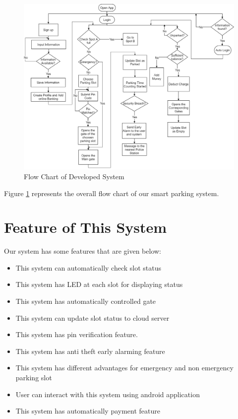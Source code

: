 \begin{figure}[H]
\centering
\includegraphics[width=1.0\textwidth]{figures/flowChartFull.png}
\caption{Flow Chart of Developed System}
\label{floww}
\end{figure}
Figure \ref{floww} represents the overall flow chart of our smart parking system.

\section{Feature of This System}
Our system has some features that are given below:
\begin{itemize}
    \item This system can automatically check slot status
    \item This system has LED at each slot for displaying status
    \item This system has automatically controlled gate
    \item This system can update slot status to cloud server
    \item This system has pin verification feature.
    \item This system has anti theft early alarming feature
    \item This system has different advantages for emergency and non emergency parking slot
    \item User can interact with this system using android application
    \item This system has automatically payment feature
    
\end{itemize}{}
